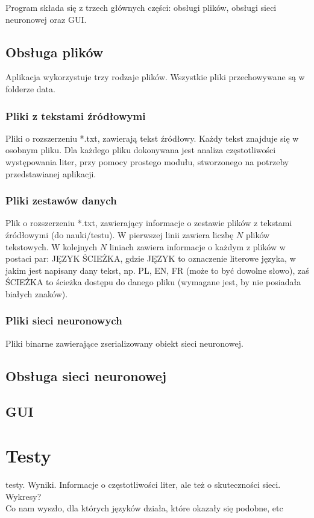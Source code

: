 \documentclass[journal]{IEEEtran}
\begin{document}
Program składa się z trzech głównych części: obsługi plików, obsługi sieci neuronowej oraz GUI.

\subsection{Obsługa plików}
Aplikacja wykorzystuje trzy rodzaje plików. Wszystkie pliki przechowywane są w folderze data.

\subsubsection{Pliki z tekstami źródłowymi}
Pliki o rozszerzeniu *.txt, zawierają tekst źródłowy. Każdy tekst znajduje się w osobnym pliku. Dla każdego pliku
dokonywana jest analiza częstotliwości występowania liter, przy pomocy prostego modułu, stworzonego na potrzeby przedstawianej
aplikacji.

\subsubsection{Pliki zestawów danych}
Plik o rozszerzeniu *.txt, zawierający informacje o zestawie plików z tekstami źródłowymi (do nauki/testu).
W pierwszej linii zawiera liczbę $N$ plików tekstowych. W kolejnych $N$ liniach zawiera informacje o każdym z plików
w postaci par: JĘZYK ŚCIEŻKA, gdzie JĘZYK to oznaczenie literowe języka, w jakim jest napisany dany tekst, np. PL, EN, FR
(może to być dowolne słowo), zaś ŚCIEŻKA to ścieżka dostępu do danego pliku (wymagane jest, by nie posiadała białych znaków).

\subsubsection{Pliki sieci neuronowych}
Pliki binarne zawierające zserializowany obiekt sieci neuronowej.

\subsection{Obsługa sieci neuronowej}


\subsection{GUI}



\section{Testy}
 testy. Wyniki. Informacje o częstotliwości liter, ale też o skuteczności sieci. Wykresy? \\
Co nam wyszło, dla których języków działa, które okazały się podobne, etc
\end{document}
